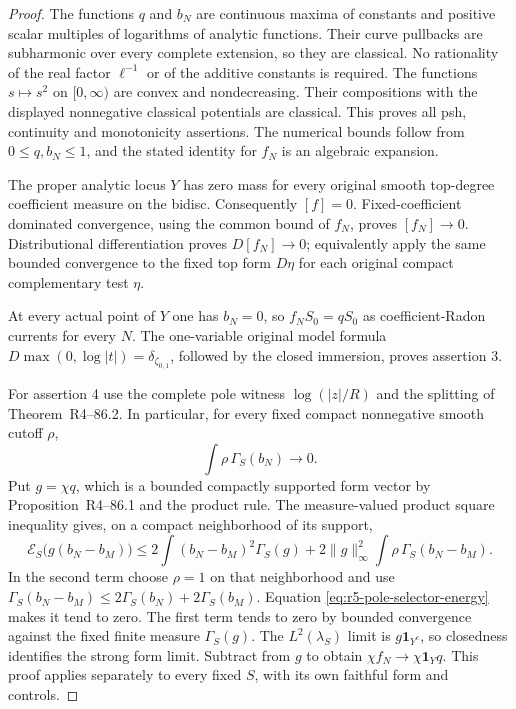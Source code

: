 \documentclass[11pt,a4paper]{article}
\numberwithin{equation}{section}
\theoremstyle{definition}
\theoremstyle{remark}
\begin{document}
\begin{proof}
The functions $q$ and $b_N$ are continuous maxima of constants
and positive scalar multiples of logarithms of analytic functions.
Their curve pullbacks are subharmonic over every complete extension,
so they are classical. No rationality of the real factor $\ell^{-1}$
or of the additive constants is required.
The functions $s\mapsto s^2$ on $[0,\infty)$ are convex and
nondecreasing. Their compositions with the displayed nonnegative
classical potentials are classical. This proves all psh,
continuity and monotonicity assertions. The numerical bounds
follow from $0\leq q,b_N\leq1$, and the stated identity for
$f_N$ is an algebraic expansion.

The proper analytic locus $Y$ has zero mass for every original
smooth top-degree coefficient measure on the bidisc. Consequently
$[f]=0$. Fixed-coefficient dominated convergence, using the
common bound of $f_N$, proves $[f_N]\to0$. Distributional
differentiation proves $D[f_N]\to0$; equivalently apply the
same bounded convergence to the fixed top form $D\eta$ for
each original compact complementary test $\eta$.

At every actual point of $Y$ one has $b_N=0$, so
$f_NS_0=qS_0$ as coefficient-Radon currents for every $N$.
The one-variable original model formula
$D\max(0,\log|t|)=\delta_{\zeta_{0,1}}$, followed by the
closed immersion, proves assertion 3.

For assertion 4 use the complete pole witness
$\log(|z|/R)$ and the splitting of
Theorem~\textup{R4--86.2}. In particular,
for every fixed compact nonnegative smooth cutoff $\rho$,
\begin{equation}\label{eq:r5-pole-selector-energy}
 \int\rho\,\Gamma_S(b_N)\longrightarrow0.
\end{equation}
Put $g=\chi q$, which is a bounded compactly supported form
vector by Proposition~\textup{R4--86.1} and
the product rule. The measure-valued product square inequality
gives, on a compact neighborhood of its support,
\[
 \mathcal E_S\bigl(g(b_N-b_M)\bigr)
 \leq
 2\int(b_N-b_M)^2\Gamma_S(g)
 +2\|g\|_\infty^2\int\rho\,\Gamma_S(b_N-b_M).
\]
In the second term choose $\rho=1$ on that neighborhood and
use $\Gamma_S(b_N-b_M)\leq
2\Gamma_S(b_N)+2\Gamma_S(b_M)$. Equation
\eqref{eq:r5-pole-selector-energy} makes it tend to zero.
The first term tends to zero by bounded convergence against
the fixed finite measure $\Gamma_S(g)$.
The $L^2(\lambda_S)$ limit is $g\mathbf1_{Y^c}$, so closedness
identifies the strong form limit. Subtract from $g$ to obtain
$\chi f_N\to\chi\mathbf1_Yq$. This proof applies separately
to every fixed $S$, with its own faithful form and controls.


\end{proof}
\end{document}
